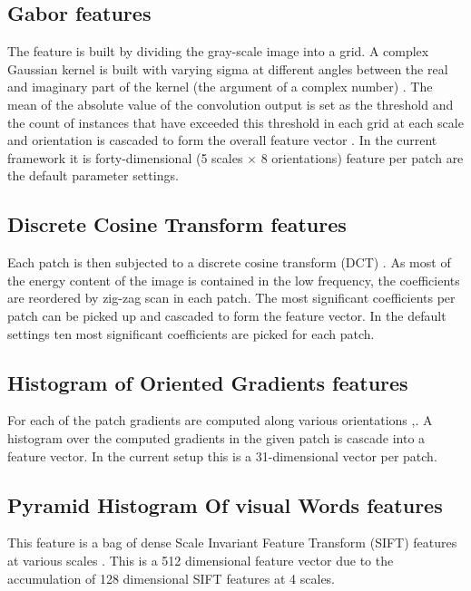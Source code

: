 \documentclass[runningheads]{llncs}
\begin{document}
\subsection{Gabor features}
\label{ssec:gbf}
The feature is built by dividing the gray-scale image into a grid. A complex Gaussian kernel is built with varying sigma at different angles between the real and imaginary part of the kernel (the argument of a complex number) \cite{CCPBN10}. The mean of the absolute value of the convolution output is set as the threshold and the count of instances that have exceeded this threshold in each grid at each scale and orientation is cascaded to form the overall feature vector \cite{LKF05}. In the current framework it is forty-dimensional (5 scales $\times$ 8 orientations) feature per patch are the default parameter settings.


\subsection{Discrete Cosine Transform features}
\label{ssec:dctf}
Each patch is then subjected to a discrete cosine transform (DCT)  \cite{ANR74}. As most of the energy content of the image is contained in the low frequency, the coefficients are reordered by zig-zag scan in each patch. The most significant coefficients per patch can be picked up and cascaded to form the feature vector. In the default settings ten most significant coefficients are picked for each patch.

\subsection{Histogram of Oriented Gradients features}
\label{ssec:hog}
For each of the patch gradients are computed along various orientations \cite{DT05},\cite{FGMR09}. A histogram over the computed gradients in the given patch is cascade into a feature vector. In the current setup this is a 31-dimensional vector per patch.

\subsection{Pyramid Histogram Of visual Words features}
\label{ssec:phow}
This feature is a bag of dense Scale Invariant Feature Transform (SIFT) features at various scales \cite{Bosch07a}. This is a 512 dimensional feature vector due to the accumulation of 128 dimensional SIFT features at 4 scales.
\end{document}
